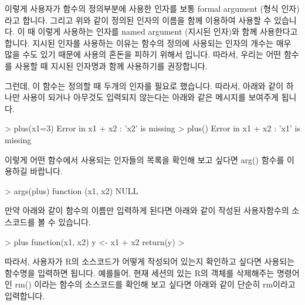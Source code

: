 이렇게 사용자가 함수의 정의부분에 사용한 인자를 보통 formal argument (형식 인자)라고 합니다. 
그리고 위와 같이 정의된 인자의 이름을 함께 이용하여 사용할 수 있습니다. 
이 때 이렇게 사용하는 인자를  named argument (지시된 인자)와 함께 사용한다고 합니다. 
지시된 인자를 사용하는 이유는 함수의 정의에 사용되는 인자의 개수는 매우 많을 수도 있기 때문에 사용의 혼돈을 피하기 위해서 입니다. 
따라서, 우리는 어떤 함수를 사용할 때 지시된 인자명과 함께 사용하기를 권장합니다. 

그런데, 이 함수는 정의할 때 두개의 인자를 필요로 했습니다. 
따라서, 아래와 같이 하나만 사용이 되거나 아무것도 입력되지 않는다는 아래와 같은 메시지를 보여주게 됩니다. 

\begin{Schunk}
\begin{Soutput}
> plus(x1=3)
Error in x1 + x2 : 'x2' is missing
> plus()
Error in x1 + x2 : 'x1' is missing
\end{Soutput}
\end{Schunk}

이렇게 어떤 함수에서 사용되는 인자들의 목록을 확인해 보고 싶다면 arg() 함수를 이용하길 바랍니다. 

\begin{Schunk}
\begin{Soutput}
> args(plus)
function (x1, x2) 
NULL

\end{Soutput}
\end{Schunk}

만약 아래와 같이 함수의 이름만 입력하게 된다면 아래와 같이 작성된 사용자함수의 소스코드를 볼 수 있습니다. 

\begin{Schunk}
\begin{Soutput}
> plus
function(x1, x2){
y <- x1 + x2
return(y)
}
> 
\end{Soutput}
\end{Schunk}

따라서, 사용자가 R의 소스코드가 어떻게 작성되어 있는지 확인하고 싶다면 사용되는 함수명을 입력하면 됩니다. 
예를들어, 현재 세션의 있는 R의 객체를 삭제해주는 명령어인 rm() 이라는 함수의 소스코드를 확인해 보고 싶다면 아래와 같이 단순히 rm이라고 입력합니다.

\begin{Schunk}
\end{Schunk}

